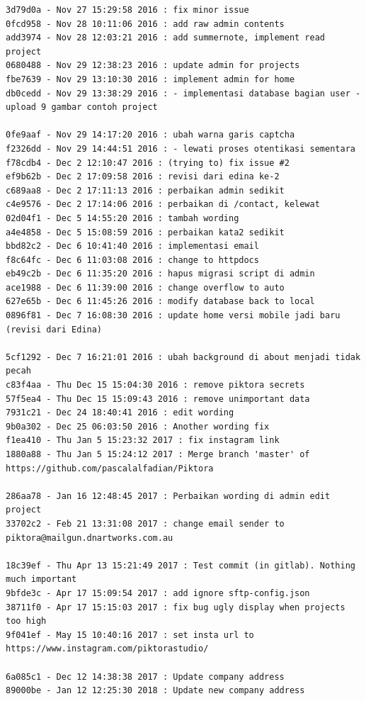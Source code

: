 \begin{lstlisting}[caption={Histori \textit{commit} pada proyek Piktora},label={lst:all_commit_piktora},language=plaintext]
3d79d0a - Nov 27 15:29:58 2016 : fix minor issue
0fcd958 - Nov 28 10:11:06 2016 : add raw admin contents
add3974 - Nov 28 12:03:21 2016 : add summernote, implement read project
0680488 - Nov 29 12:38:23 2016 : update admin for projects
fbe7639 - Nov 29 13:10:30 2016 : implement admin for home
db0cedd - Nov 29 13:38:29 2016 : - implementasi database bagian user - upload 9 gambar contoh project

0fe9aaf - Nov 29 14:17:20 2016 : ubah warna garis captcha
f2326dd - Nov 29 14:44:51 2016 : - lewati proses otentikasi sementara
f78cdb4 - Dec 2 12:10:47 2016 : (trying to) fix issue #2
ef9b62b - Dec 2 17:09:58 2016 : revisi dari edina ke-2
c689aa8 - Dec 2 17:11:13 2016 : perbaikan admin sedikit
c4e9576 - Dec 2 17:14:06 2016 : perbaikan di /contact, kelewat
02d04f1 - Dec 5 14:55:20 2016 : tambah wording
a4e4858 - Dec 5 15:08:59 2016 : perbaikan kata2 sedikit
bbd82c2 - Dec 6 10:41:40 2016 : implementasi email
f8c64fc - Dec 6 11:03:08 2016 : change to httpdocs
eb49c2b - Dec 6 11:35:20 2016 : hapus migrasi script di admin
ace1988 - Dec 6 11:39:00 2016 : change overflow to auto
627e65b - Dec 6 11:45:26 2016 : modify database back to local
0896f81 - Dec 7 16:08:30 2016 : update home versi mobile jadi baru (revisi dari Edina)

5cf1292 - Dec 7 16:21:01 2016 : ubah background di about menjadi tidak pecah
c83f4aa - Thu Dec 15 15:04:30 2016 : remove piktora secrets
57f5ea4 - Thu Dec 15 15:09:43 2016 : remove unimportant data
7931c21 - Dec 24 18:40:41 2016 : edit wording
9b0a302 - Dec 25 06:03:50 2016 : Another wording fix
f1ea410 - Thu Jan 5 15:23:32 2017 : fix instagram link
1880a88 - Thu Jan 5 15:24:12 2017 : Merge branch 'master' of https://github.com/pascalalfadian/Piktora

286aa78 - Jan 16 12:48:45 2017 : Perbaikan wording di admin edit project
33702c2 - Feb 21 13:31:08 2017 : change email sender to piktora@mailgun.dnartworks.com.au

18c39ef - Thu Apr 13 15:21:49 2017 : Test commit (in gitlab). Nothing much important
9bfde3c - Apr 17 15:09:54 2017 : add ignore sftp-config.json
38711f0 - Apr 17 15:15:03 2017 : fix bug ugly display when projects too high
9f041ef - May 15 10:40:16 2017 : set insta url to https://www.instagram.com/piktorastudio/

6a085c1 - Dec 12 14:38:38 2017 : Update company address
89000be - Jan 12 12:25:30 2018 : Update new company address
\end{lstlisting}


